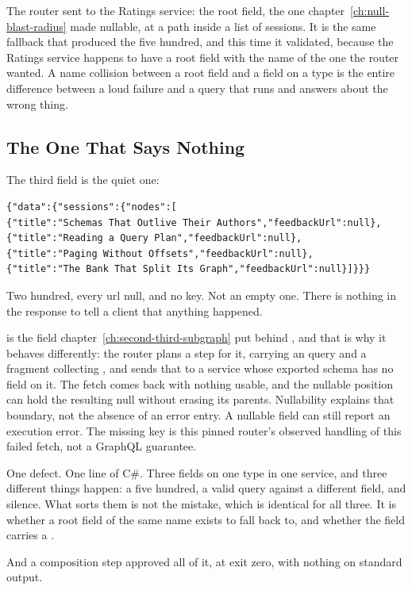 %
The router sent  to the Ratings service: the root
field, the one chapter~\ref{ch:null-blast-radius} made nullable, at a path
inside a list of sessions. It is the same fallback that produced the five
hundred, and this time it validated, because the Ratings service happens to
have a root field with the name of the one the router wanted. A name collision
between a root field and a field on a type is the entire difference between a
loud failure and a query that runs and answers about the wrong thing.

\subsection{The One That Says Nothing}

%
The third field is the quiet one:

\begin{verbatim}
{"data":{"sessions":{"nodes":[
{"title":"Schemas That Outlive Their Authors","feedbackUrl":null},
{"title":"Reading a Query Plan","feedbackUrl":null},
{"title":"Paging Without Offsets","feedbackUrl":null},
{"title":"The Bank That Split Its Graph","feedbackUrl":null}]}}}
\end{verbatim}

%
Two hundred, every url null, and no  key. Not an empty one. There
is nothing in the response to tell a client that anything happened.

%
 is the field chapter~\ref{ch:second-third-subgraph} put
behind , and that is why it behaves differently: the router
plans a  step for it, carrying an  query and
a fragment collecting , and sends that to a service whose exported
schema has no  field on it. The fetch comes back with nothing
usable, and the nullable position can hold the resulting null without
erasing its parents. Nullability explains that boundary, not the absence of
an error entry. A nullable field can still report an execution error. The
missing  key is this pinned router's observed handling of this
failed fetch, not a GraphQL guarantee.

%
One defect. One line of C\#. Three fields on one type in one service, and three
different things happen: a five hundred, a valid query against a different
field, and silence. What sorts them is not the mistake, which is identical for
all three. It is whether a root field of the same name exists to fall back to,
and whether the field carries a .

%
And a composition step approved all of it, at exit zero, with nothing on
standard output.
%
